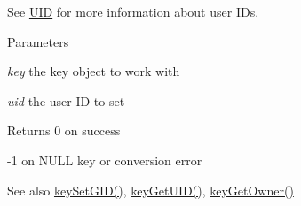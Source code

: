 See \hyperlink{group__keymeta_UID}{UID} for more information about user IDs.


\begin{DoxyParams}{Parameters}
\item[{\em key}]the key object to work with \item[{\em uid}]the user ID to set \end{DoxyParams}
\begin{DoxyReturn}{Returns}
0 on success 

-\/1 on NULL key or conversion error 
\end{DoxyReturn}
\begin{DoxySeeAlso}{See also}
\hyperlink{group__keymeta_ga9e3d0fb3f7ba906e067727b9155d22e3}{keySetGID()}, \hyperlink{group__keymeta_gacaa5060e67b03f50ae49a3620c54bc46}{keyGetUID()}, \hyperlink{group__keyname_ga35922a017bee8b4bcb493bbdfad9d6f5}{keyGetOwner()} 
\end{DoxySeeAlso}
